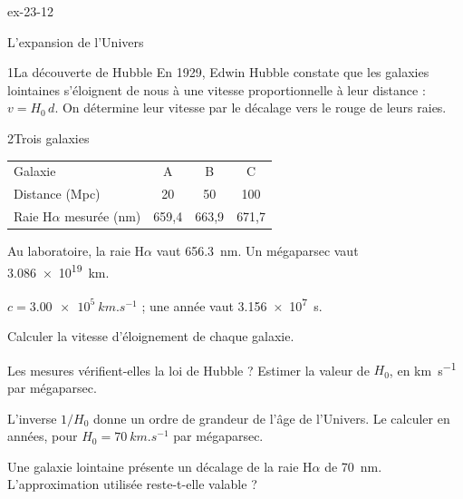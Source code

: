 \begin{blocLivre}{ex-23-12}
\begin{exercice}[3]{L'expansion de l'Univers}
\begin{docu}{1}{La découverte de Hubble}
En 1929, Edwin Hubble constate que les galaxies lointaines s'éloignent de nous à une vitesse proportionnelle à leur
distance : $v=H_0\,d$. On détermine leur vitesse par le décalage vers le rouge de leurs raies.
\end{docu}
\begin{docu}{2}{Trois galaxies}
\begin{center}
\begin{tabular}{lccc}
\toprule
Galaxie & A & B & C \\
Distance (Mpc) & 20 & 50 & 100 \\
Raie H$\alpha$ mesurée (nm) & 659,4 & 663,9 & 671,7 \\
\bottomrule
\end{tabular}
\end{center}
Au laboratoire, la raie H$\alpha$ vaut \qty{656,3}{nm}. Un mégaparsec vaut \qty{3,086e19}{km}.
\end{docu}
\begin{donnees}
$c=\qty{3,00e5}{km.s^{-1}}$ ; une année vaut \qty{3,156e7}{s}.
\end{donnees}
\begin{questions}
\item Calculer la vitesse d'éloignement de chaque galaxie.
\item \initiative Les mesures vérifient-elles la loi de Hubble ? Estimer la valeur de $H_0$, en \unit{km.s^{-1}} par mégaparsec.
\item L'inverse $1/H_0$ donne un ordre de grandeur de l'âge de l'Univers. Le calculer en années, pour $H_0=\qty{70}{km.s^{-1}}$
par mégaparsec.
\item Une galaxie lointaine présente un décalage de la raie H$\alpha$ de \qty{70}{nm}. L'approximation utilisée reste-t-elle
valable ?
\end{questions}
\end{exercice}
\end{blocLivre}
